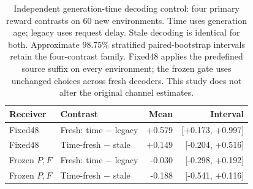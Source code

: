 \begin{table}[tb]\centering\small
\caption{Independent generation-time decoding control: four primary reward contrasts on 60 new environments. Time uses generation age; legacy uses request delay. Stale decoding is identical for both. Approximate 98.75\% stratified paired-bootstrap intervals retain the four-contrast family. Fixed48 applies the predefined source suffix on every environment; the frozen gate uses unchanged choices across fresh decoders. This study does not alter the original channel estimates.}\label{tab:decoder}
\setlength{\tabcolsep}{3pt}\begin{tabular}{llrr}\toprule Receiver & Contrast & Mean & Interval\\\midrule
Fixed48 & Fresh: time $-$ legacy & +0.579 & [+0.173, +0.997]\\
Fixed48 & Time-fresh $-$ stale & +0.149 & [-0.204, +0.516]\\
Frozen $P,F$ & Fresh: time $-$ legacy & -0.030 & [-0.298, +0.192]\\
Frozen $P,F$ & Time-fresh $-$ stale & -0.188 & [-0.541, +0.116]\\
\bottomrule\end{tabular}\end{table}
